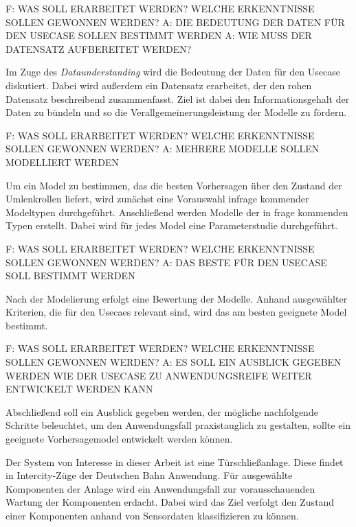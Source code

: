 F: WAS SOLL ERARBEITET WERDEN? WELCHE ERKENNTNISSE SOLLEN GEWONNEN WERDEN?
A: DIE BEDEUTUNG DER DATEN FÜR DEN USECASE SOLLEN BESTIMMT WERDEN
A: WIE MUSS DER DATENSATZ AUFBEREITET WERDEN?

Im Zuge des \textit{Dataunderstanding} wird die Bedeutung der Daten für den Usecase diskutiert. Dabei wird außerdem ein Datensatz erarbeitet, der den rohen Datensatz beschreibend zusammenfasst. Ziel ist dabei den Informationsgehalt der Daten zu bündeln und so die Verallgemeinerungsleistung der Modelle zu fördern.

F: WAS SOLL ERARBEITET WERDEN? WELCHE ERKENNTNISSE SOLLEN GEWONNEN WERDEN?
A: MEHRERE MODELLE SOLLEN MODELLIERT WERDEN

Um ein Model zu bestimmen, das die besten Vorhersagen über den Zustand der Umlenkrollen liefert, wird zunächst eine Vorauswahl infrage kommender Modeltypen durchgeführt. Anschließend werden Modelle der in frage kommenden Typen erstellt. Dabei wird für jedes Model eine Parameterstudie durchgeführt.

F: WAS SOLL ERARBEITET WERDEN? WELCHE ERKENNTNISSE SOLLEN GEWONNEN WERDEN?
A: DAS BESTE FÜR DEN USECASE SOLL BESTIMMT WERDEN

Nach der Modelierung erfolgt eine Bewertung der Modelle. Anhand ausgewählter Kriterien, die für den Usecaes relevant sind, wird das am besten geeignete Model bestimmt.

F: WAS SOLL ERARBEITET WERDEN? WELCHE ERKENNTNISSE SOLLEN GEWONNEN WERDEN?
A: ES SOLL EIN AUSBLICK GEGEBEN WERDEN WIE DER USECASE ZU ANWENDUNGSREIFE WEITER ENTWICKELT WERDEN KANN

Abschließend soll ein Ausblick gegeben werden, der mögliche nachfolgende Schritte beleuchtet, um den Anwendungsfall praxistauglich zu gestalten, sollte ein geeignete Vorhersagemodel entwickelt werden können.



















Der System von Interesse in dieser Arbeit ist eine Türschließanlage. Diese findet in Intercity-Züge der Deutschen Bahn Anwendung. Für ausgewählte Komponenten der Anlage wird ein Anwendungsfall zur vorausschauenden Wartung der Komponenten erdacht. Dabei wird das Ziel verfolgt den Zustand einer Komponenten anhand von Sensordaten klassifizieren zu können. 

